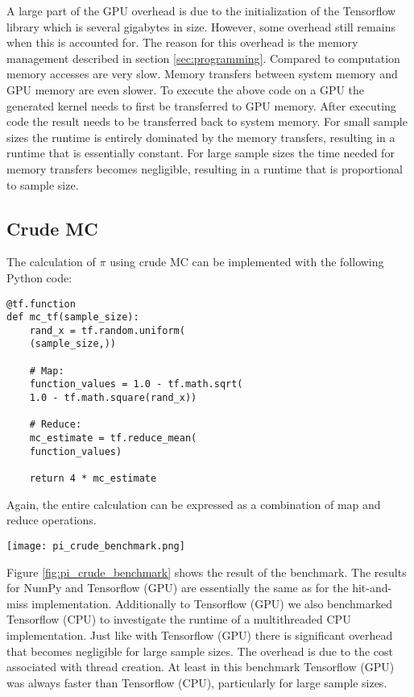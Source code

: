 A large part of the GPU overhead is due to the initialization of the Tensorflow library which is several gigabytes in size.
However, some overhead still remains when this is accounted for.
The reason for this overhead is the memory management described in section \ref{sec:programming}.
Compared to computation memory accesses are very slow.
Memory transfers between system memory and GPU memory are even slower.
To execute the above code on a GPU the generated kernel needs to first be transferred to GPU memory.
After executing code the result needs to be transferred back to system memory.
For small sample sizes the runtime is entirely dominated by the memory transfers,
resulting in a runtime that is essentially constant.
For large sample sizes the time needed for memory transfers becomes negligible,
resulting in a runtime that is proportional to sample size.
\subsection{Crude MC}
The calculation of $\pi$ using crude MC can be implemented with the following Python code:
\begin{lstlisting}
@tf.function
def mc_tf(sample_size):
    rand_x = tf.random.uniform(
	(sample_size,))

    # Map:
    function_values = 1.0 - tf.math.sqrt(
	1.0 - tf.math.square(rand_x))

    # Reduce:
    mc_estimate = tf.reduce_mean(
	function_values)

    return 4 * mc_estimate
\end{lstlisting}
Again, the entire calculation can be expressed as a combination of map and reduce operations.
\begin{figure*}
	\texttt{[image: pi\_crude\_benchmark.png]}
	\caption{
		Benchmark of crude MC.
		Runtime with NumPy is proportional to sample size.
		Runtime with Tensorflow (GPU) is constant for $N <= 10^7$.
		Runtime with Tensorflow (CPU and GPU) is proportional to sample size for $N >= 10^9$
		(assuming Tensorflow is already initialized).
	}
	\label{fig:pi_crude_benchmark}
\end{figure*}
Figure \ref{fig:pi_crude_benchmark} shows the result of the benchmark.
The results for NumPy and Tensorflow (GPU) are essentially the same as for the hit-and-miss implementation.
Additionally to Tensorflow (GPU) we also benchmarked Tensorflow (CPU) to investigate the runtime
of a multithreaded CPU implementation.
Just like with Tensorflow (GPU) there is significant overhead that becomes negligible for large sample sizes.
The overhead is due to the cost associated with thread creation.
At least in this benchmark Tensorflow (GPU) was always faster than Tensorflow (CPU), particularly for large sample sizes.
